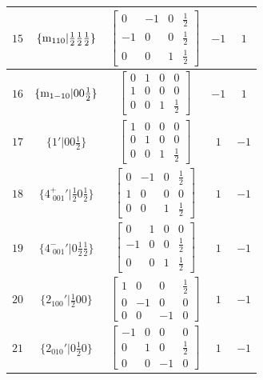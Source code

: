 \documentclass[fleqn,8pt]{jsarticle}
\begin{document}
\begin{longtable}{ccccc}
$ 15 $ & $ \{{\rm m}_{110}|\frac{1}{2} \frac{1}{2} \frac{1}{2}\} $ & $ \begin{bmatrix} 0 & -1 & 0 & \frac{1}{2} \\ -1 & 0 & 0 & \frac{1}{2} \\ 0 & 0 & 1 & \frac{1}{2} \end{bmatrix} $ & $ -1 $ & $ 1 $ \\ \hline
$ 16 $ & $ \{{\rm m}_{1-10}|0 0 \frac{1}{2}\} $ & $ \begin{bmatrix} 0 & 1 & 0 & 0 \\ 1 & 0 & 0 & 0 \\ 0 & 0 & 1 & \frac{1}{2} \end{bmatrix} $ & $ -1 $ & $ 1 $ \\ \hline
$ 17 $ & $ \{1{}'|0 0 \frac{1}{2}\} $ & $ \begin{bmatrix} 1 & 0 & 0 & 0 \\ 0 & 1 & 0 & 0 \\ 0 & 0 & 1 & \frac{1}{2} \end{bmatrix} $ & $ 1 $ & $ -1 $ \\ \hline
$ 18 $ & $ \{4^{+}_{\,\,001}{}'|\frac{1}{2} 0 \frac{1}{2}\} $ & $ \begin{bmatrix} 0 & -1 & 0 & \frac{1}{2} \\ 1 & 0 & 0 & 0 \\ 0 & 0 & 1 & \frac{1}{2} \end{bmatrix} $ & $ 1 $ & $ -1 $ \\ \hline
$ 19 $ & $ \{4^{-}_{\,\,001}{}'|0 \frac{1}{2} \frac{1}{2}\} $ & $ \begin{bmatrix} 0 & 1 & 0 & 0 \\ -1 & 0 & 0 & \frac{1}{2} \\ 0 & 0 & 1 & \frac{1}{2} \end{bmatrix} $ & $ 1 $ & $ -1 $ \\ \hline
$ 20 $ & $ \{2{}_{100}{}'|\frac{1}{2} 0 0\} $ & $ \begin{bmatrix} 1 & 0 & 0 & \frac{1}{2} \\ 0 & -1 & 0 & 0 \\ 0 & 0 & -1 & 0 \end{bmatrix} $ & $ 1 $ & $ -1 $ \\ \hline
$ 21 $ & $ \{2{}_{010}{}'|0 \frac{1}{2} 0\} $ & $ \begin{bmatrix} -1 & 0 & 0 & 0 \\ 0 & 1 & 0 & \frac{1}{2} \\ 0 & 0 & -1 & 0 \end{bmatrix} $ & $ 1 $ & $ -1 $ \\ \hline

\end{longtable}
\end{document}
